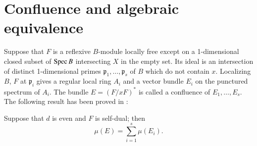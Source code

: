 \section{Confluence and algebraic equivalence}\label{chap7-sec3}

Suppose that $F$ is a reflexive $B$-module locally free except on a
1-dimen\-sional closed subset of $\operatorname{Spec} B$ intersecting $X$ in the empty
set. Its ideal is an intersection of distinct 1-dimensional primes
$\mathfrak{p}_{1},\ldots,\mathfrak{p}_{s}$ of $B$ which do not contain
$x$. Localizing $B$, $F$ at $\mathfrak{p}_{i}$ gives a regular local
ring $A_{i}$ and a vector bundle $E_{i}$ on the punctured spectrum of
$A_{i}$. The bundle $E=(F/xF)^{\ast}$ is called a confluence of
$E_{1},\ldots,E_{s}$. The following result has been proved
in \cite{chap7-key4}: 

\begin{theorem}\label{chap7-thm3.1}
Suppose that $d$ is even and $F$ is self-dual; then
$$
\mu(E)=\sum\limits^{s}_{i=1}\mu(E_{i}).
$$
\end{theorem}

